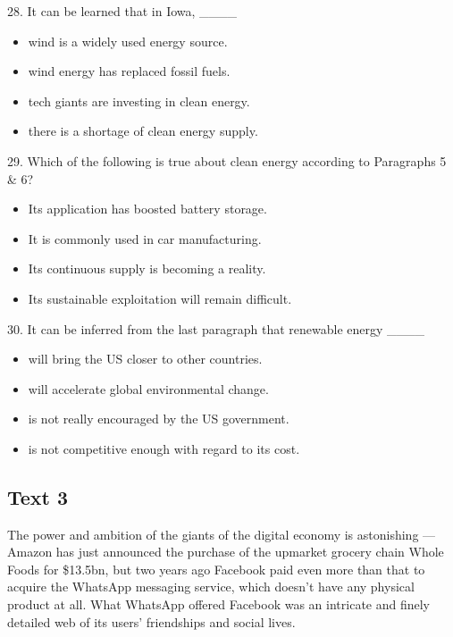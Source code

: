 \documentclass[UTF8,11pt]{ctexart}
\begin{document}
28. It can be learned that in Iowa, \_\_\_\_


\begin{itemize}[leftmargin=2em,itemsep=.2em,topsep=.4em]\item[A.] wind is a widely used energy source.
\item[B.] wind energy has replaced fossil fuels.
\item[C.] tech giants are investing in clean energy.
\item[D.] there is a shortage of clean energy supply.
\end{itemize}

29. Which of the following is true about clean energy according to Paragraphs 5 \& 6?


\begin{itemize}[leftmargin=2em,itemsep=.2em,topsep=.4em]\item[A.] Its application has boosted battery storage.
\item[B.] It is commonly used in car manufacturing.
\item[C.] Its continuous supply is becoming a reality.
\item[D.] Its sustainable exploitation will remain difficult.
\end{itemize}

30. It can be inferred from the last paragraph that renewable energy \_\_\_\_


\begin{itemize}[leftmargin=2em,itemsep=.2em,topsep=.4em]\item[A.] will bring the US closer to other countries.
\item[B.] will accelerate global environmental change.
\item[C.] is not really encouraged by the US government.
\item[D.] is not competitive enough with regard to its cost.
\end{itemize}

\subsection*{\textbf{Text 3}}


The power and ambition of the giants of the digital economy is astonishing — Amazon has just announced the purchase of the upmarket grocery chain Whole Foods for \$13.5bn, but two years ago Facebook paid even more than that to acquire the WhatsApp messaging service, which doesn’t have any physical product at all. What WhatsApp offered Facebook was an intricate and finely detailed web of its users’ friendships and social lives.
\end{document}
